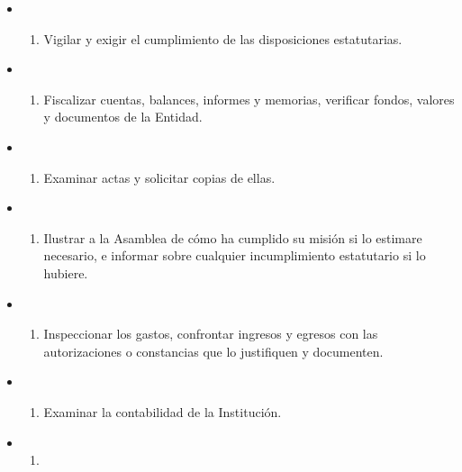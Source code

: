 \documentclass[]{book}
\providecommand{\tightlist}{%
  \setlength{\itemsep}{0pt}\setlength{\parskip}{0pt}}
\begin{document}
\begin{itemize}
  \begin{itemize}
  \item
    \begin{enumerate}
    \def\labelenumi{\alph{enumi})}
    \tightlist
    \item
      Vigilar y exigir el cumplimiento de las disposiciones
      estatutarias.
    \end{enumerate}
  \item
    \begin{enumerate}
    \def\labelenumi{\alph{enumi})}
    \setcounter{enumi}{1}
    \tightlist
    \item
      Fiscalizar cuentas, balances, informes y memorias, verificar
      fondos, valores y documentos de la Entidad.
    \end{enumerate}
  \item
    \begin{enumerate}
    \def\labelenumi{\alph{enumi})}
    \setcounter{enumi}{2}
    \tightlist
    \item
      Examinar actas y solicitar copias de ellas.
    \end{enumerate}
  \item
    \begin{enumerate}
    \def\labelenumi{\alph{enumi})}
    \setcounter{enumi}{3}
    \tightlist
    \item
      Ilustrar a la Asamblea de cómo ha cumplido su misión si lo
      estimare necesario, e informar sobre cualquier incumplimiento
      estatutario si lo hubiere.
    \end{enumerate}
  \item
    \begin{enumerate}
    \def\labelenumi{\alph{enumi})}
    \setcounter{enumi}{4}
    \tightlist
    \item
      Inspeccionar los gastos, confrontar ingresos y egresos con las
      autorizaciones o constancias que lo justifiquen y documenten.
    \end{enumerate}
  \item
    \begin{enumerate}
    \def\labelenumi{\alph{enumi})}
    \setcounter{enumi}{5}
    \tightlist
    \item
      Examinar la contabilidad de la Institución.
    \end{enumerate}
  \item
    \begin{enumerate}
    \def\labelenumi{\alph{enumi})}
    \setcounter{enumi}{6}
    \tightlist
    \item

\end{enumerate}
\end{itemize}
\end{itemize}
\end{document}
